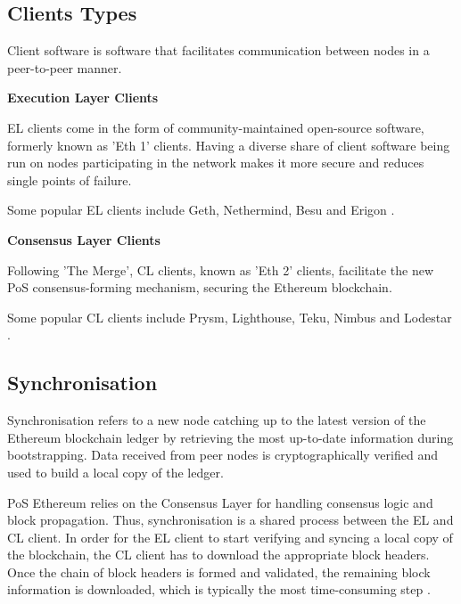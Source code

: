 

\subsection{Clients Types}

Client software is software that facilitates communication between nodes in a peer-to-peer manner.

\textbf{Execution Layer Clients}

EL clients come in the form of community-maintained open-source software, formerly known as 'Eth 1' clients. Having a diverse share of client software being run on nodes participating in the network makes it more secure and reduces single points of failure.

Some popular EL clients include Geth, Nethermind, Besu and Erigon \cite{EthereumEthereum.org}. 

\textbf{Consensus Layer Clients }

Following 'The Merge', CL clients, known as 'Eth 2' clients, facilitate the new PoS consensus-forming mechanism, securing the Ethereum blockchain.

Some popular CL clients include Prysm, Lighthouse, Teku, Nimbus and Lodestar \cite{EthereumEthereum.org}. 

\subsection{Synchronisation} 
\label{SyncLitRev}

Synchronisation refers to a new node catching up to the latest version of the Ethereum blockchain ledger by retrieving the most up-to-date information during bootstrapping. Data received from peer nodes is cryptographically verified and used to build a local copy of the ledger.

PoS Ethereum relies on the Consensus Layer for handling consensus logic and block propagation. Thus, synchronisation is a shared process between the EL and CL client. In order for the EL client to start verifying and syncing a local copy of the blockchain, the CL client has to download the appropriate block headers. Once the chain of block headers is formed and validated, the remaining block information is downloaded, which is typically the most time-consuming step \cite{2022DeveloperGo-ethereum}.


